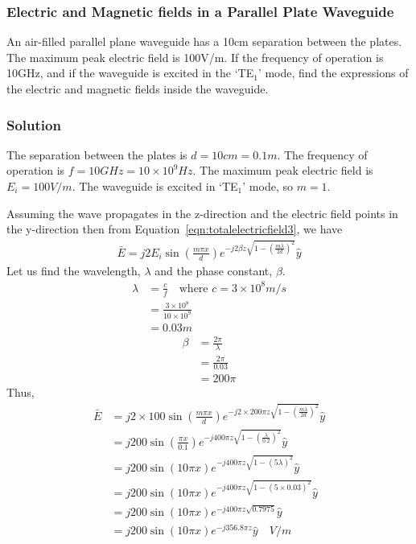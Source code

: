 \begin{exmp}
\subsubsection*{Electric and Magnetic fields in a Parallel Plate Waveguide}
An air-filled parallel plane waveguide has a 10cm separation between the plates. The maximum peak electric field is 100V/m. If the frequency of operation is 10GHz, and if the waveguide is excited in the `TE$_1$' mode, find the expressions of the electric and magnetic fields inside the waveguide.

\subsubsection*{Solution}
The separation between the plates is $d = 10cm = 0.1m$. The frequency of operation is $f = 10GHz = 10\times 10^9Hz$. The maximum peak electric field is $E_i = 100V/m$. The waveguide is excited in `TE$_1$' mode, so $m=1$.

Assuming the wave propagates in the z-direction and the electric field points in the y-direction then from Equation~\eqref{eqn:totalelectricfield3}, we have
\begin{align*}
\bar{E} = j 2E_i\sin(\frac{m\pi x}{d})e^{-j 2\beta z\sqrt{1 - \left(\frac{m\lambda}{2d}\right)^2}}\hat{y}
\end{align*}
Let us find the wavelength, $\lambda$ and the phase constant, $\beta$.
\begin{align*}
\lambda &= \frac{c}{f}\quad\text{where } c = 3\times 10^8m/s\\
&= \frac{3\times 10^8}{10\times 10^9}\\
&= 0.03m
\end{align*}
\begin{align*}
\beta &= \frac{2\pi}{\lambda}\\
&= \frac{2\pi}{0.03}\\
&= 200\pi
\end{align*}
Thus,
\begin{align*}
\bar{E} &= j 2\times100\sin(\frac{m\pi x}{d})e^{-j 2\times200\pi z\sqrt{1 - \left(\frac{m\lambda}{2d}\right)^2}}\hat{y}\\
&= j 200\sin(\frac{\pi x}{0.1})e^{-j 400\pi z\sqrt{1 - \left(\frac{\lambda}{0.2}\right)^2}}\hat{y}\\
&= j 200\sin(10\pi x)e^{-j 400\pi z\sqrt{1 - {(5\lambda)}^2}}\hat{y}\\
&= j 200\sin(10\pi x)e^{-j 400\pi z\sqrt{1 - {(5\times0.03)}^2}}\hat{y}\\
&= j 200\sin(10\pi x)e^{-j 400\pi z\sqrt{0.7975}}\hat{y}\\
&= j 200\sin(10\pi x)e^{-j 356.8\pi z}\hat{y}\quad V/m
\end{align*}


\end{exmp}
